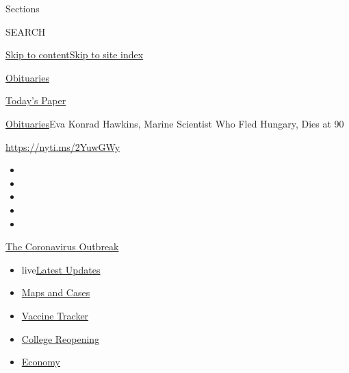 Sections

SEARCH

\protect\hyperlink{site-content}{Skip to
content}\protect\hyperlink{site-index}{Skip to site index}

\href{https://www.nytimes.com/section/obituaries}{Obituaries}

\href{https://myaccount.nytimes.com/auth/login?response_type=cookie\&client_id=vi}{}

\href{https://www.nytimes.com/section/todayspaper}{Today's Paper}

\href{/section/obituaries}{Obituaries}\textbar{}Eva Konrad Hawkins,
Marine Scientist Who Fled Hungary, Dies at 90

\url{https://nyti.ms/2YuwGWy}

\begin{itemize}
\item
\item
\item
\item
\item
\end{itemize}

\href{https://www.nytimes.com/news-event/coronavirus?action=click\&pgtype=Article\&state=default\&region=TOP_BANNER\&context=storylines_menu}{The
Coronavirus Outbreak}

\begin{itemize}
\tightlist
\item
  live\href{https://www.nytimes.com/2020/08/03/world/coronavirus-covid-19.html?action=click\&pgtype=Article\&state=default\&region=TOP_BANNER\&context=storylines_menu}{Latest
  Updates}
\item
  \href{https://www.nytimes.com/interactive/2020/us/coronavirus-us-cases.html?action=click\&pgtype=Article\&state=default\&region=TOP_BANNER\&context=storylines_menu}{Maps
  and Cases}
\item
  \href{https://www.nytimes.com/interactive/2020/science/coronavirus-vaccine-tracker.html?action=click\&pgtype=Article\&state=default\&region=TOP_BANNER\&context=storylines_menu}{Vaccine
  Tracker}
\item
  \href{https://www.nytimes.com/2020/08/02/us/covid-college-reopening.html?action=click\&pgtype=Article\&state=default\&region=TOP_BANNER\&context=storylines_menu}{College
  Reopening}
\item
  \href{https://www.nytimes.com/live/2020/08/03/business/stock-market-today-coronavirus?action=click\&pgtype=Article\&state=default\&region=TOP_BANNER\&context=storylines_menu}{Economy}
\end{itemize}


